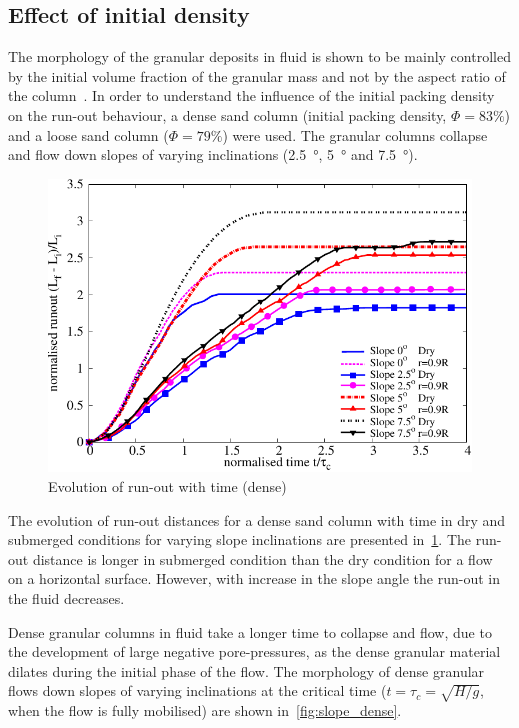 \subsection{Effect of initial density}
The morphology of the granular deposits in fluid is shown to be mainly controlled by the initial volume fraction of the granular mass and not by the aspect ratio of the column~\citep{Rondon2011,Pailha2008}. In order to understand the influence of the initial packing density on the run-out behaviour, a dense sand column (initial packing density, $\Phi=83\%$) and a loose sand column ($\Phi=79\%$) were used. The granular columns collapse and flow down slopes of varying inclinations (\SI{2.5}{\degree}, \SI{5}{\degree} and \SI{7.5}{\degree}).

\begin{figure}
\centering
\includegraphics[width=0.97\columnwidth]{Runout_dense_slope}
\caption{Evolution of run-out with time (dense)}
\label{fig:run_dense}
\end{figure}

The evolution of run-out distances for a dense sand column with time in dry and submerged conditions for varying slope inclinations are presented in~\cref{fig:run_dense}. The run-out distance is longer in submerged condition than the dry condition for a flow on a horizontal surface. However, with increase in the slope angle the run-out in the fluid decreases.

Dense granular columns in fluid take a longer time to collapse and flow, due to the development of large negative pore-pressures, as the dense granular material dilates during the initial phase of the flow. The morphology of dense granular flows down slopes of varying inclinations at the critical time ($t=\tau_{c}=\sqrt{H/g}$, when the flow is fully mobilised) are shown in~\cref{fig:slope_dense}.

